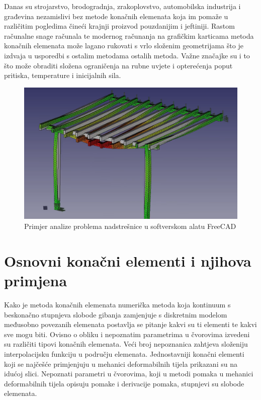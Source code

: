 \documentclass[a4paper,twoside,12pt]{memoir} %
\begin{document}
Danas su strojarstvo, brodogradnja, zrakoplovstvo, automobilska industrija i građevina nezamislivi bez metode konačnih elemenata koja im pomaže u različitim pogledima čineći krajnji proizvod pouzdanijim i jeftiniji. Rastom računalne snage računala te modernog računanja na grafičkim karticama metoda konačnih elemenata može lagano rukovati s vrlo složenim geometrijama što je izdvaja u usporedbi s ostalim metodama ostalih metoda. Važne značajke su i to što može obraditi složena ograničenja na rubne uvjete i opterećenja poput pritiska, temperature i inicijalnih sila.
\begin{figure}[h!t]
\begin{center}
\includegraphics[scale=0.3]{pictures/chapter_fem/FEM_primjer.png}
\caption{Primjer analize problema nadstrešnice u softverskom alatu FreeCAD \cite{youtube_freecad}}
\end{center}
\end{figure}


\section{Osnovni konačni elementi i njihova primjena}
Kako je metoda konačnih elemenata numerička metoda koja kontinuum s beskonačno stupnjeva slobode gibanja zamjenjuje s diskretnim modelom međusobno povezanih elemenata postavlja se pitanje kakvi su ti elementi te kakvi sve mogu biti. Ovisno o obliku i nepoznatim parametrima u čvorovima izvedeni su različiti tipovi konačnih elemenata. Veći broj nepoznanica zahtjeva složeniju interpolacijsku funkciju u području elemenata. Jednostavniji konačni elementi koji se najčešće primjenjuju u mehanici deformabilnih tijela prikazani su na idućoj slici. Nepoznati parametri u čvorovima, koji u metodi pomaka u mehanici deformabilnih tijela opisuju pomake i derivacije pomaka, stupnjevi su slobode elemenata. \par
\end{document}
